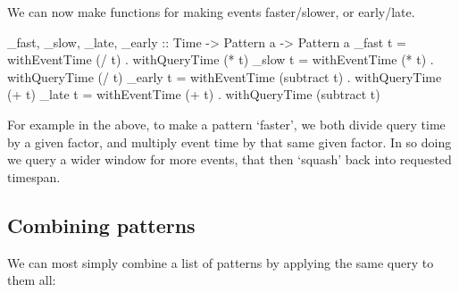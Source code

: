 \documentclass[
]{article}
\newenvironment{Shaded}{}{}
\newcommand{\DataTypeTok}[1]{\textcolor[rgb]{0.56,0.13,0.00}{#1}}
\newcommand{\FunctionTok}[1]{\textcolor[rgb]{0.02,0.16,0.49}{#1}}
\newcommand{\NormalTok}[1]{#1}
\newcommand{\OperatorTok}[1]{\textcolor[rgb]{0.40,0.40,0.40}{#1}}
\newcommand{\OtherTok}[1]{\textcolor[rgb]{0.00,0.44,0.13}{#1}}
\begin{document}
We can now make functions for making events faster/slower, or
early/late.

\begin{Shaded}
\begin{Highlighting}[]
\NormalTok{\_fast, \_slow, \_late,}\OtherTok{ \_early ::} \DataTypeTok{Time} \OtherTok{{-}\textgreater{}} \DataTypeTok{Pattern}\NormalTok{ a }\OtherTok{{-}\textgreater{}} \DataTypeTok{Pattern}\NormalTok{ a}
\NormalTok{\_fast t  }\OtherTok{=}\NormalTok{ withEventTime (}\OperatorTok{/}\NormalTok{ t) }\OperatorTok{.}\NormalTok{ withQueryTime (}\OperatorTok{*}\NormalTok{ t)}
\NormalTok{\_slow t  }\OtherTok{=}\NormalTok{ withEventTime (}\OperatorTok{*}\NormalTok{ t) }\OperatorTok{.}\NormalTok{ withQueryTime (}\OperatorTok{/}\NormalTok{ t)}
\NormalTok{\_early t }\OtherTok{=}\NormalTok{ withEventTime (}\FunctionTok{subtract}\NormalTok{ t) }\OperatorTok{.}\NormalTok{ withQueryTime (}\OperatorTok{+}\NormalTok{ t)}
\NormalTok{\_late t  }\OtherTok{=}\NormalTok{ withEventTime (}\OperatorTok{+}\NormalTok{ t) }\OperatorTok{.}\NormalTok{ withQueryTime (}\FunctionTok{subtract}\NormalTok{ t)}
\end{Highlighting}
\end{Shaded}

For example in the above, to make a pattern `faster', we both divide
query time by a given factor, and multiply event time by that same given
factor. In so doing we query a wider window for more events, that then
`squash' back into requested timespan.

\subsection{Combining patterns}\label{combining-patterns}

We can most simply combine a list of patterns by applying the same query
to them all:

\begin{Shaded}
\end{Shaded}
\end{document}

